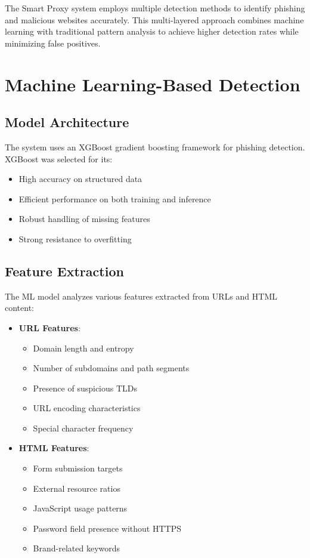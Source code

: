 The Smart Proxy system employs multiple detection methods to identify phishing and malicious websites accurately. This multi-layered approach combines machine learning with traditional pattern analysis to achieve higher detection rates while minimizing false positives.

\section{Machine Learning-Based Detection}

\subsection{Model Architecture}
The system uses an XGBoost gradient boosting framework for phishing detection. XGBoost was selected for its:

\begin{itemize}
    \item High accuracy on structured data
    \item Efficient performance on both training and inference
    \item Robust handling of missing features
    \item Strong resistance to overfitting
\end{itemize}

\subsection{Feature Extraction}
The ML model analyzes various features extracted from URLs and HTML content:

\begin{itemize}
    \item \textbf{URL Features}:
    \begin{itemize}
        \item Domain length and entropy
        \item Number of subdomains and path segments
        \item Presence of suspicious TLDs
        \item URL encoding characteristics
        \item Special character frequency
    \end{itemize}
    
    \item \textbf{HTML Features}:
    \begin{itemize}
        \item Form submission targets
        \item External resource ratios
        \item JavaScript usage patterns
        \item Password field presence without HTTPS
        \item Brand-related keywords
    \end{itemize}
\end{itemize}

